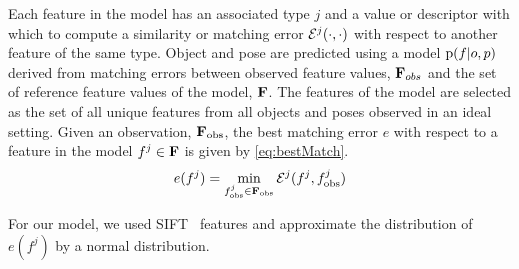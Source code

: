             Each feature in the model has an associated type $j$ and a value or descriptor with which to compute a similarity or matching error $\mathcal{E}^j(\cdot,\cdot)$ with respect to another feature of the same type. Object and pose are predicted using a model $\text{p}(f|o,p)$ derived from matching errors between observed feature values, $\mathbf{F}_{obs}$ and the set of reference feature values of the model, $\mathbf{F}$. The features of the model are selected as the set of all unique features from all objects and poses observed in an ideal setting. Given an observation, $\mathbf{F}_{\text{obs}}$, the best matching error $e$ with respect to a feature in the model $f^j \in \mathbf{F}$ is given by \eqref{eq:bestMatch}.
            \begin{equation}
                \label{eq:bestMatch}
                e(f^j) = \min_{f^j_{\text{obs}} \in \set{F}_{\text{obs}}}\cursive{E}^j(f^j,f^j_{\text{obs}})
            \end{equation}
            

            For our model, we used SIFT~\cite{lowe2004distinctive} features and approximate the distribution of $e(f^j)$ by a normal distribution.   

            

